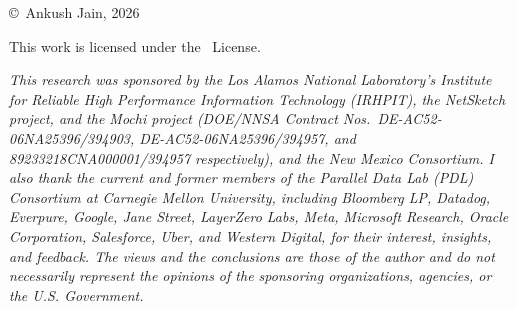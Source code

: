 \begin{titlingpage}
\null%
\vfill
\centering
\copyright\ Ankush Jain, 2026\\
\vspace{1em}

{\small
\doclicenseImage[imagewidth=8em]\par
\vspace{0.5em}
This work is licensed under the \doclicenseLongNameRef\ License.
}

\vfill

\begin{minipage}{\textwidth}
  {\small\emph{
      This research was sponsored by the Los Alamos National Laboratory's Institute for Reliable
      High Performance Information Technology (IRHPIT), the NetSketch project, and the Mochi project
      (DOE/NNSA Contract Nos.~\mbox{DE-AC52-06NA25396/394903}, \mbox{DE-AC52-06NA25396/394957}, and
      \mbox{89233218CNA000001/394957} respectively), and the New Mexico Consortium.
      I also thank the
      current and former members of the Parallel Data Lab (PDL) Consortium at Carnegie Mellon
      University, including Bloomberg LP, Datadog, Everpure, Google, Jane Street, LayerZero Labs,
      Meta, Microsoft Research, Oracle Corporation, Salesforce, Uber, and Western Digital, for their
      interest, insights, and feedback.
      The views and the conclusions are those of the author and do not necessarily represent the opinions of the sponsoring organizations, agencies, or the U.S. Government.
    }
    \par
  }
\end{minipage}
\end{titlingpage}
\restoregeometry

\setcounter{page}{3} %

\dominitoc
\adjustmtc[5] %

{\hypersetup{linkcolor=black}\tableofcontents}
\listoftables
\listoffigures

